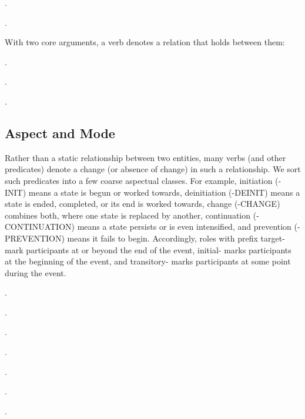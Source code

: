 \documentclass[a4paper]{article}
\newcommand{\frs}[1]{\mbox{\textsf{#1}}} %
\newcommand{\rl}[1]{\textsf{#1}}
\begin{document}
\ex.

\ex.

With two core arguments, a verb denotes a relation that holds between them:

\ex.

\ex.

\ex.

\subsection{Aspect and Mode}
\label{sec:aspect-mode}

Rather than a static relationship between two entities, many verbs (and other
predicates) denote a change (or absence of change) in such a relationship. We
sort such predicates into a few coarse aspectual classes. For example,
initiation (\frs{-INIT}) means a state is begun or worked towards, deinitiation
(\frs{-DEINIT}) means a state is ended, completed, or its end is worked
towards, change (\frs{-CHANGE}) combines both, where one state is replaced by
another, continuation (\frs{-CONTINUATION}) means a state persists or is even
intensified, and prevention (\frs{-PREVENTION}) means it fails to begin.
Accordingly, roles with prefix \rl{target-} mark participants at or beyond the
end of the event, \rl{initial-} marks participants at the beginning of the
event, and \rl{transitory-} marks participants at some point during the event.

\ex.

\ex.

\ex.

\ex.

\ex.

\ex.\label{ex:fall}

\ex.
\end{document}
